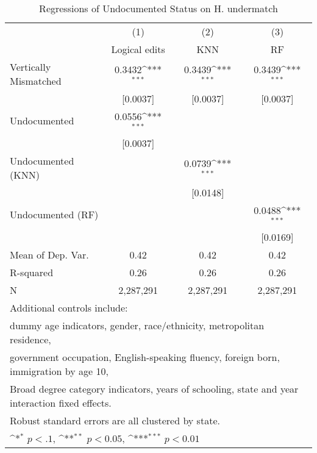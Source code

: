 \begin{table}[htbp]\centering
\def\sym#1{\ifmmode^{#1}\else\(^{#1}\)\fi}
\caption{Regressions of Undocumented Status on H. undermatch}
\begin{tabular}{l*{3}{c}}
\toprule
                    &\multicolumn{1}{c}{(1)}         &\multicolumn{1}{c}{(2)}         &\multicolumn{1}{c}{(3)}         \\
                    &Logical edits         &         KNN         &          RF         \\
\midrule
Vertically Mismatched&      0.3432\sym{***}&      0.3439\sym{***}&      0.3439\sym{***}\\
                    &    [0.0037]         &    [0.0037]         &    [0.0037]         \\
\addlinespace
Undocumented        &      0.0556\sym{***}&                     &                     \\
                    &    [0.0037]         &                     &                     \\
\addlinespace
Undocumented (KNN)  &                     &      0.0739\sym{***}&                     \\
                    &                     &    [0.0148]         &                     \\
\addlinespace
Undocumented (RF)   &                     &                     &      0.0488\sym{***}\\
                    &                     &                     &    [0.0169]         \\
\midrule
Mean of Dep. Var.   &        0.42         &        0.42         &        0.42         \\
R-squared           &        0.26         &        0.26         &        0.26         \\
N                   &   2,287,291         &   2,287,291         &   2,287,291         \\
\bottomrule
\multicolumn{4}{l}{\footnotesize Additional controls include:}\\
\multicolumn{4}{l}{\footnotesize dummy age indicators, gender, race/ethnicity, metropolitan residence,}\\
\multicolumn{4}{l}{\footnotesize government occupation, English-speaking fluency, foreign born, immigration by age 10,}\\
\multicolumn{4}{l}{\footnotesize Broad degree category indicators, years of schooling, state and year interaction fixed effects.}\\
\multicolumn{4}{l}{\footnotesize Robust standard errors are all clustered by state.}\\
\multicolumn{4}{l}{\footnotesize \sym{*} \(p<.1\), \sym{**} \(p<0.05\), \sym{***} \(p<0.01\)}\\
\end{tabular}
\end{table}
